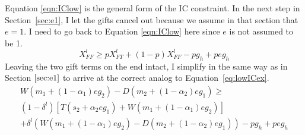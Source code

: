 \documentclass[12pt]{article}
\newcommand{\al}{\alpha}
\newcommand{\de}{\delta}
\begin{document}
Equation \ref{eqn:IClow} is the general form of the IC constraint. In the next step in Section~\ref{sec:e1}, I let the gifts cancel out because we assume in that section that $e=1$. I need to go back to Equation \ref{eqn:IClow} here since $e$ is not assumed to be 1.
\[
	X_{FF}^l \geq pX_{FT}^l+(1-p)X_{FF}^l-pg_h+peg_h
\]
Leaving the two gift terms on the end intact, I simplify in the same way as in Section $\ref{sec:e1}$ to arrive at the correct analog to Equation~\ref{eq:lowICex}.
		\begin{multline*}
			W\left(m_1 + \left(1-\al_1\right)eg_2\right)-D\left(m_2 + \left(1-\al_2\right)eg_1\right) \geq \\
			\left(1-\de^l\right) \left[T\left(s_2 + \al_2eg_1\right) + W\left(m_1 + \left(1-\al_1\right)eg_2\right) \right] \\
			+ \de^l \left(W\left(m_1 + \left(1-\al_1\right)eg_2\right)-D\left(m_2 + \left(1-\al_2\right)eg_1\right)\right) -pg_h+peg_h
		\end{multline*}
\end{document}

